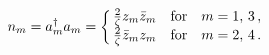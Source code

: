 \begin{equation}
 n_m=a_m^{\dagger}a_m=
\left\{ 
\begin{array}{@{\,}lll}
\frac{2}{\zeta} z_m\bar{z}_m  & \textrm{for} &  m=1,\,3\,,\\
\frac{2}{\zeta} \bar{z}_mz_m  & \textrm{for} &  m=2,\,4\,.
\end{array}
\right.\label{eq:4.0.5}
\end{equation}

